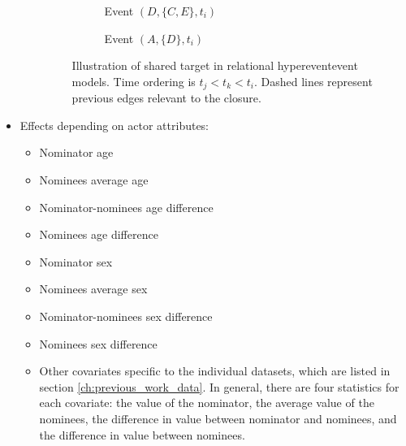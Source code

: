 \begin{itemize}
\begin{itemize}
\begin{figure}
\begin{mdframed}
\begin{subfigure}[t]{0.3\linewidth}
					\caption{Event $(D,\{C,E\},t_i)$}
				\end{subfigure}
				\hfill
				\begin{subfigure}[t]{0.3\linewidth}
					\vskip 0pt
					\caption{Event $(A,\{D\},t_i)$}
				\end{subfigure}
				\caption{Illustration of shared target in relational hypereventevent models. Time ordering is $t_j < t_k < t_i$. Dashed lines represent previous edges relevant to the closure.}
				\label{fig:rhem_shared_target}
			\end{mdframed}
		\end{figure}
	
	\end{itemize}
	\item Effects depending on actor attributes:
	\begin{itemize}
		\item Nominator age
		\item Nominees average age
		\item Nominator-nominees age difference
		\item Nominees age difference
		\item Nominator sex
		\item Nominees average sex
		\item Nominator-nominees sex difference
		\item Nominees sex difference
		\item Other covariates specific to the individual datasets, which are listed in section \ref{ch:previous_work_data}. In general, there are four statistics for each covariate: the value of the nominator, the average value of the nominees, the difference in value between nominator and nominees, and the difference in value between nominees.
	\end{itemize}
\end{itemize}

